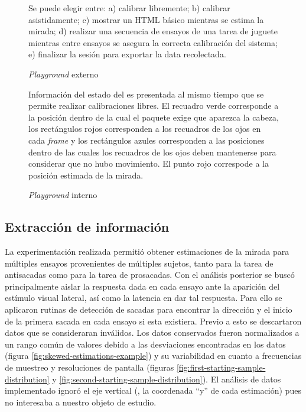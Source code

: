   \begin{figure}
    \centering

    Se puede elegir entre:
    a) calibrar libremente;
    b) calibrar asistidamente;
    c) mostrar un HTML básico mientras se estima la mirada;
    d) realizar una secuencia de ensayos de una tarea de juguete mientras
    entre ensayos se asegura la correcta calibración del sistema;
    e) finalizar la sesión para exportar la data recolectada.

    \caption{\textit{Playground} externo}
    \label{fig:external-playground}
  \end{figure}

  \begin{figure}
    \centering

    Información del estado del \eyetracker es presentada al mismo tiempo que se
    permite realizar calibraciones libres.
    El recuadro verde corresponde a la posición dentro de la cual el paquete
    \webgazer exige que aparezca la cabeza, los rectángulos rojos corresponden
    a los recuadros de los ojos en cada \textit{frame} y los rectángulos azules
    corresponden a las posiciones dentro de las cuales los recuadros de los
    ojos deben mantenerse para considerar que no hubo movimiento.
    El punto rojo correspode a la posición estimada de la mirada.

    \caption{\textit{Playground} interno}
    \label{fig:internal-playground}
  \end{figure}

\subsection{Extracción de información}

  La experimentación realizada permitió obtener estimaciones de la mirada para
  múltiples ensayos provenientes de múltiples sujetos, tanto para la tarea de
  antisacadas como para la tarea de prosacadas.
  Con el análisis posterior se buscó principalmente aislar la respuesta dada en
  cada ensayo ante la aparición del estímulo visual lateral, así como la
  latencia en dar tal respuesta.
  Para ello se aplicaron rutinas \adhoc de detección de sacadas para encontrar
  la dirección y el inicio de la primera sacada en cada ensayo si esta
  existiera.
  Previo a esto se descartaron datos que se consideraran inválidos.
  Los datos conservados fueron normalizados a un rango común de valores debido
  a las desviaciones encontradas en los datos (figura
  \ref{fig:skewed-estimations-example}) y su variabilidad en cuanto a
  frecuencias de muestreo y resoluciones de pantalla (figuras
  \ref{fig:first-starting-sample-distribution} y
  \ref{fig:second-starting-sample-distribution}).
  El análisis de datos implementado ignoró el eje vertical (\ie, la coordenada
  ``y'' de cada estimación) pues no interesaba a nuestro objeto de estudio.

